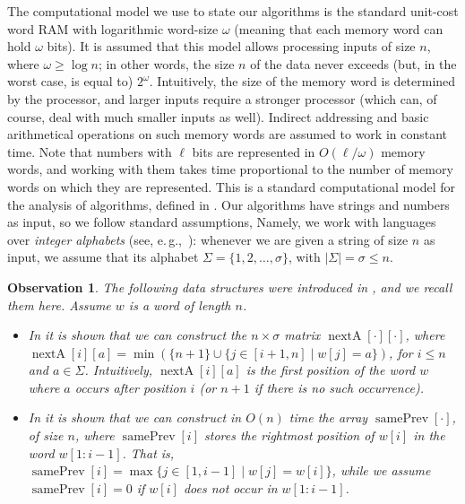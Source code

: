 \documentclass[runningheads,UKenglish,cleveref, autoref, thm-restate]{llncs}
\DeclareMathOperator{\prevArray}{samePrev}
\DeclareMathOperator{\nextpos}{nextA}
\newtheorem{observation}{Observation}
\begin{document}
The computational model we use to state our algorithms is the standard unit-cost word RAM with logarithmic word-size $\omega$ (meaning that each memory word can hold $\omega$ bits). It is assumed that this model allows processing inputs of size $n$, where $\omega \geq \log n$; in other words, the size $n$ of the data never exceeds (but, in the worst case, is equal to) $2^\omega$. Intuitively, the size of the memory word is determined by the processor, and larger inputs require a stronger processor (which can, of course, deal with much smaller inputs as well). Indirect addressing and basic arithmetical operations on such memory words are assumed to work in constant time. Note that numbers with $\ell$ bits are represented in $O(\ell/\omega )$ memory words, and working with them takes time proportional to the number of memory words on which they are represented. This is a standard computational model for the analysis of algorithms, defined in \cite{FredmanW90}. Our algorithms have strings and numbers as input, so we follow standard assumptions, Namely, we work with languages over {\em integer alphabets} (see, e.\,g.,~\cite{crochemore}): whenever we are given a string of size $n$ as input, we assume that its alphabet $\Sigma=\{1,2,\ldots,\sigma\}$, with $|\Sigma|=\sigma\leq n$.

\begin{observation}\label{preprocessing}
The following data structures were introduced in \cite{DBLP:journals/fuin/KoscheKMS22,KoscheKMP22}, and we recall them here. Assume $w$ is a word of length $n$. 
\begin{itemize}
\item In \cite{KoscheKMP22} it is shown that we can construct the $n\times \sigma$ matrix $\nextpos[\cdot][\cdot]$, where $\nextpos[i][a] = \min (\{n+1\}\cup \{j \in [i + 1, n] \mid w[j]=a\}) $, for $i\leq n$ and $a\in \Sigma$. Intuitively, $\nextpos[i][a]$ is the first position of the word $w$ where $a$ occurs after position $i$ (or $n+1$ if there is no such occurrence).  
\item In \cite{DBLP:journals/fuin/KoscheKMS22} it is shown that we can construct in $O(n)$ time the array $\prevArray[\cdot]$, of size $n$, where $\prevArray[i]$ stores the rightmost position of $w[i]$ in the word $w[1:i-1]$.
That is, $\prevArray[i] = \max \lbrace j \in [1, i -1] \mid w[j] = w[i]\rbrace$, while we assume $\prevArray[i] = 0$ if $w[i] $ does not occur in $w[1:i-1]$. 
\end{itemize}
\end{observation} 
\end{document}
